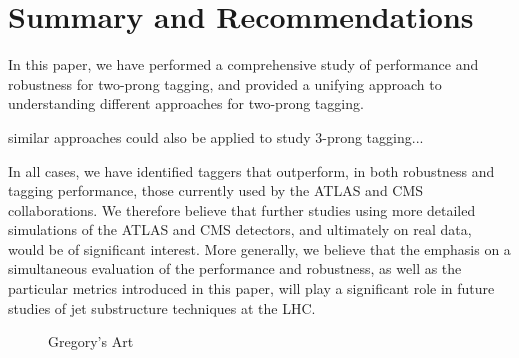 \documentclass[11pt,letterpaper]{article}
\begin{document}
\section{Summary and Recommendations}\label{sec:conc}

In this paper, we have performed a comprehensive study of performance and robustness for two-prong tagging, and provided a unifying approach to understanding different approaches for two-prong tagging. 

similar approaches could also be applied to study $3$-prong tagging...


In all cases, we have identified taggers that outperform, in both robustness and tagging performance, those currently used by the ATLAS and CMS collaborations. We therefore believe that further studies using more detailed simulations of the ATLAS and CMS detectors, and ultimately on real data, would be of significant interest. More generally, we believe that the emphasis on a simultaneous evaluation of the performance and robustness, as well as the particular metrics introduced in this paper, will play a significant role in future studies of jet substructure techniques at the LHC.






\begin{figure}
\begin{center}
\qquad
{}
\end{center}
\caption{Gregory's Art
}
\label{fig:phasespace}
\end{figure}
\end{document}
